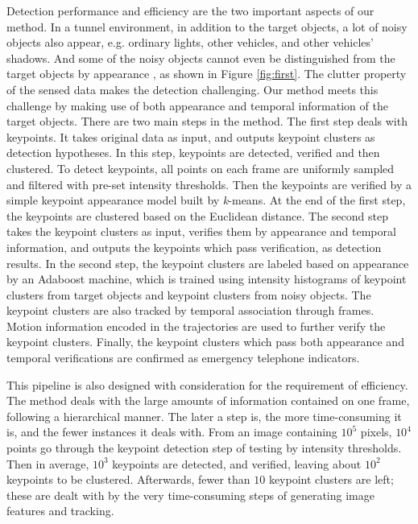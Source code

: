 \documentclass{JoITSRstyle}
\begin{document}
Detection performance and efficiency are the two important aspects of our method.
In a tunnel environment, in addition to the target objects, a lot of noisy objects also appear, e.g. ordinary lights, other vehicles, and other vehicles' shadows. And some of the noisy objects cannot even be distinguished from the target objects by appearance , as shown in Figure \ref{fig:first}. The clutter property of the sensed data makes the detection challenging.
Our method meets this challenge by making use of both appearance and temporal information of the target objects. There are two main steps in the method. The first step deals with keypoints. It takes original data as input, and outputs keypoint clusters as detection hypotheses. In this step, keypoints are detected, verified and then clustered. To detect keypoints, all points on each frame are uniformly sampled and filtered with pre-set intensity thresholds.  Then the keypoints are verified by a simple keypoint appearance model   built by \emph{k}-means. At the end of the first step, the keypoints are clustered based on the Euclidean distance. The second step takes the keypoint clusters as input, verifies them by appearance and temporal information, and outputs the keypoints which pass verification, as detection results. In the second step, the keypoint clusters are labeled based on appearance by an Adaboost machine, which is trained using intensity histograms of keypoint clusters from target objects and keypoint clusters from noisy objects. The keypoint clusters are also tracked by temporal association through frames. Motion information encoded in the trajectories are used to further verify the keypoint clusters. Finally, the keypoint clusters which pass both appearance and temporal verifications are confirmed as emergency telephone indicators.

This pipeline is also designed  with consideration for the requirement of efficiency.  The method deals with the large amounts of information contained on one frame, following a hierarchical manner. The later a step is, the more time-consuming it is, and the fewer instances it deals with. From an image containing $10^5$ pixels, $10^4$ points go through the keypoint detection step of testing by intensity thresholds. Then in average, $10^3$ keypoints are detected, and verified, leaving about $10^2$ keypoints to be clustered. Afterwards, fewer than $10$ keypoint clusters are left; these are dealt with by the very time-consuming steps of generating image features and tracking.
\end{document}
